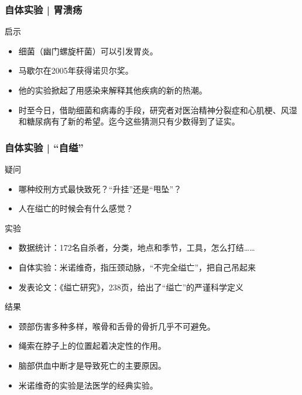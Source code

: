 \begin{frame}
  \frametitle{自体实验 | 胃溃疡}
  \begin{block}{启示}
    \begin{itemize}
      \item 细菌（幽门螺旋杆菌）可以引发胃炎。
      \item 马歇尔在2005年获得诺贝尔奖。
      \item 他的实验掀起了用感染来解释其他疾病的新的热潮。
      \item 时至今日，借助细菌和病毒的手段，研究者对医治精神分裂症和心肌梗、风湿和糖尿病有了新的希望。迄今这些猜测只有少数得到了证实。
    \end{itemize}
  \end{block}
\end{frame}

\begin{frame}
  \frametitle{自体实验 | “自缢”}
  \begin{block}{疑问}
    \begin{itemize}
      \item 哪种绞刑方式最快致死？“升挂”还是“甩坠”？
      \item 人在缢亡的时候会有什么感觉？
    \end{itemize}
  \end{block}
  \vspace{-0.3em}
  \pause
  \begin{block}{实验}
    \begin{itemize}
      \item 数据统计：172名自杀者，分类，地点和季节，工具，怎么打结……
      \item 自体实验：米诺维奇，指压颈动脉，“不完全缢亡”，把自己吊起来
      \item 发表论文：《缢亡研究》，238页，给出了“缢亡”的严谨科学定义
    \end{itemize}
  \end{block}
  \vspace{-0.3em}
  \pause
  \begin{block}{结果}
    \begin{itemize}
      \item 颈部伤害多种多样，喉骨和舌骨的骨折几乎不可避免。
      \item 绳索在脖子上的位置起着决定性的作用。
      \item 脑部供血中断才是导致死亡的主要原因。
      \item 米诺维奇的实验是法医学的经典实验。
    \end{itemize}
  \end{block}
\end{frame}

